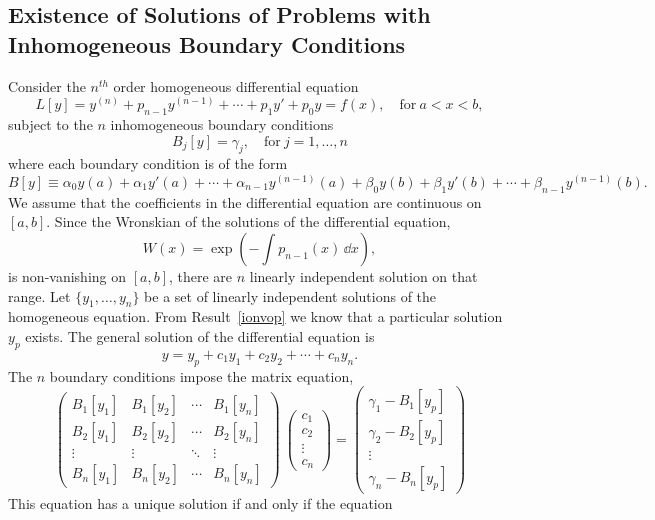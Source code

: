 \subsection{Existence of Solutions of Problems with Inhomogeneous Boundary
  Conditions}

Consider the $n^{th}$ order homogeneous differential equation
\[
L[y] = y^{(n)} + p_{n-1} y^{(n-1)} + \cdots + p_1 y' + p_0 y = f(x), \quad
\mathrm{for}\ a < x < b,
\]
subject to the $n$ inhomogeneous boundary conditions
\[
B_j[y] = \gamma_j, \quad \mathrm{for}\ j = 1,\ldots,n
\]
where each boundary condition is of the form
\[
B[y] \equiv \alpha_0 y(a) + \alpha_1 y'(a) + \cdots + \alpha_{n-1} y^{(n-1)}(a)
+ \beta_0 y(b) + \beta_1 y'(b) + \cdots + \beta_{n-1} y^{(n-1)}(b).
\]
We assume that the coefficients in the differential equation are continuous
on $[a,b]$.  Since the Wronskian of the solutions of the differential 
equation,
\[
W(x) = \exp \left( - \int p_{n-1}(x) \,\dd x \right),
\]
is non-vanishing on $[a,b]$, there are $n$ linearly independent solution
on that range.   Let $\{y_1,\ldots,y_n\}$ be a set of linearly independent
solutions of the homogeneous equation.  From Result~\ref{ionvop} we know that
a particular solution $y_p$ exists.
The general solution of the differential equation is
\[
y = y_p + c_1 y_1 + c_2 y_2 + \cdots + c_n y_n.
\]
The $n$ boundary conditions impose the matrix equation,
\[
\begin{pmatrix}
  B_1[y_1] & B_1[y_2] & \cdots & B_1[y_n] \\
  B_2[y_1] & B_2[y_2] & \cdots & B_2[y_n] \\
  \vdots   & \vdots   & \ddots & \vdots   \\
  B_n[y_1] & B_n[y_2] & \cdots & B_n[y_n] 
\end{pmatrix}
\ 
\begin{pmatrix}
  c_1 \\
  c_2 \\
  \vdots \\
  c_n
\end{pmatrix}
=
\begin{pmatrix}
  \gamma_1 - B_1[y_p] \\
  \gamma_2 - B_2[y_p] \\
  \vdots \\
  \gamma_n - B_n[y_p]
\end{pmatrix}
\]
This equation has a unique solution if and only if the equation
